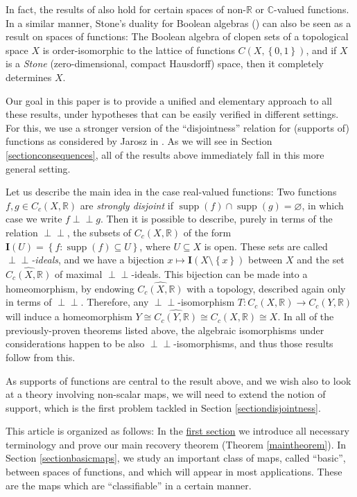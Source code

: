 \documentclass[letter,11pt]{amsart}
\theoremstyle{plain}		\newtheorem{theorem}[generalnumbering]{Theorem}
\theoremstyle{plain}		\newtheorem{corollary}[generalnumbering]{Corollary}
\theoremstyle{definition}		\newtheorem{definition}[generalnumbering]{Definition}
\theoremstyle{definition}		\newtheorem{example}[generalnumbering]{Example}
\theoremstyle{plain}		\newtheorem{proposition}[generalnumbering]{Proposition}
\theoremstyle{plain}		\newtheorem{lemma}[generalnumbering]{Lemma}
\theoremstyle{plain}    \newtheorem{plainstyle}[generalnumbering]{\namefordifferentenvironment}
\theoremstyle{plain}    \newtheorem*{plainstyle*}{\namefordifferentenvironment}
\theoremstyle{definition}    \newtheorem{definitionstyle}[generalnumbering]{\namefordifferentenvironment}
\theoremstyle{definition}    \newtheorem*{definitionstyle*}{\namefordifferentenvironment}
\newcommand{\perpp}{\perp\!\!\!\perp}
\DeclareMathOperator{\supp}{supp}
\begin{document}
In fact, the results of \cite{MR0020715,MR2324919} also hold for certain spaces of non-$\mathbb{R}$ or $\mathbb{C}$-valued functions. In a similar manner, Stone's duality for Boolean algebras (\cite{MR1501865}) can also be seen as a result on spaces of functions: The Boolean algebra of clopen sets of a topological space $X$ is order-isomorphic to the lattice of functions $C(X,\left\{0,1\right\})$, and if $X$ is a \emph{Stone} (zero-dimensional, compact Hausdorff) space, then it completely determines $X$.

Our goal in this paper is to provide a unified and elementary approach to all these results, under hypotheses that can be easily verified in different settings. For this, we use a stronger version of the ``disjointness'' relation for (supports of) functions as considered by Jarosz in \cite{MR1060366}. As we will see in Section \ref{sectionconsequences}, all of the results above immediately fall in this more general setting.

Let us describe the main idea in the case real-valued functions: Two functions $f,g\in C_c(X,\mathbb{R})$ are \emph{strongly disjoint} if $\supp(f)\cap\supp(g)=\varnothing$, in which case we write $f\perpp g$. Then it is possible to describe, purely in terms of the relation $\perpp$, the subsets of  $C_c(X,\mathbb{R})$ of the form $\mathbf{I}(U)=\left\{f:\supp(f)\subseteq U\right\}$, where $U\subseteq X$ is open. These sets are called \emph{$\perpp$-ideals}, and we have a bijection $x\mapsto \mathbf{I}(X\setminus\left\{x\right\})$ between $X$ and the set $\widehat{C_c(X,\mathbb{R})}$ of maximal $\perpp$-ideals. This bijection can be made into a homeomorphism, by endowing $\widehat{C_c(X,\mathbb{R})}$ with a topology, described again only in terms of $\perpp$. Therefore, any $\perpp$-isomorphism $T\colon C_c(X,\mathbb{R})\to C_c(Y,\mathbb{R})$ will induce a homeomorphism $Y\cong\widehat{C_c(Y,\mathbb{R})}\cong \widehat{C_c(X,\mathbb{R})}\cong X$. In all of the previously-proven theorems listed above, the algebraic isomorphisms under considerations happen to be also $\perpp$-isomorphisms, and thus those results follow from this.

As supports of functions are central to the result above, and we wish also to look at a theory involving non-scalar maps, we will need to extend the notion of support, which is the first problem tackled in Section \ref{sectiondisjointness}.

This article is organized as follows: In the \hyperref[sectiondisjointness]{first section} we introduce all necessary terminology and prove our main recovery theorem (Theorem \ref{maintheorem}). In Section \ref{sectionbasicmaps}, we study an important class of maps, called ``basic'', between spaces of functions, and which will appear in most applications. These are the maps which are ``classifiable'' in a certain manner.
\end{document}
